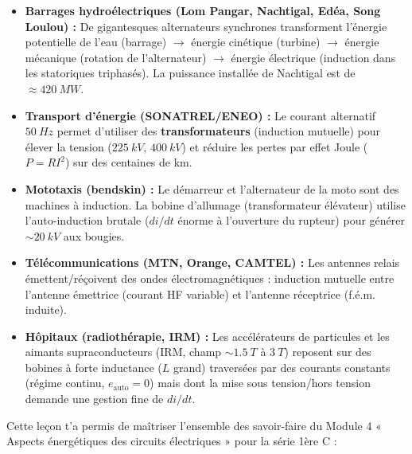\documentclass[11pt]{article}
\newcounter{popsec}
\newcounter{popsub}
\newcommand{\courssub}[1]{%
  \stepcounter{popsub}%
  \par\vspace{9pt}\noindent{\popxbold\fontsize{11.5}{13}\selectfont\color{popink}{\color{poporange}\thepopsec.\thepopsub}\hspace{6pt}#1}\par\nopagebreak\vspace{4pt}
}
\begin{document}
\begin{savaistu}
\begin{itemize}
\item \textbf{Barrages hydroélectriques (Lom Pangar, Nachtigal, Edéa, Song Loulou) :} De gigantesques alternateurs synchrones transforment l'énergie potentielle de l'eau (barrage) $\rightarrow$ énergie cinétique (turbine) $\rightarrow$ énergie mécanique (rotation de l'alternateur) $\rightarrow$ énergie électrique (induction dans les statoriques triphasés). La puissance installée de Nachtigal est de $\approx \SI{420}{MW}$.
\item \textbf{Transport d'énergie (SONATREL/ENEO) :} Le courant alternatif $\SI{50}{Hz}$ permet d'utiliser des \textbf{transformateurs} (induction mutuelle) pour élever la tension ($\SI{225}{kV}$, $\SI{400}{kV}$) et réduire les pertes par effet Joule ($P = R I^2$) sur des centaines de km.
\item \textbf{Mototaxis (bendskin) :} Le démarreur et l'alternateur de la moto sont des machines à induction. La bobine d'allumage (transformateur élévateur) utilise l'auto-induction brutale ($di/dt$ énorme à l'ouverture du rupteur) pour générer $\sim \SI{20}{kV}$ aux bougies.
\item \textbf{Télécommunications (MTN, Orange, CAMTEL) :} Les antennes relais émettent/réçoivent des ondes électromagnétiques : induction mutuelle entre l'antenne émettrice (courant HF variable) et l'antenne réceptrice (f.é.m. induite).
\item \textbf{Hôpitaux (radiothérapie, IRM) :} Les accélérateurs de particules et les aimants supraconducteurs (IRM, champ $\sim \SI{1,5}{T}$ à $\SI{3}{T}$) reposent sur des bobines à forte inductance ($L$ grand) traversées par des courants constants (régime continu, $e_{\text{auto}}=0$) mais dont la mise sous tension/hors tension demande une gestion fine de $di/dt$.
\end{itemize}
\end{savaistu}

\courssub{Bilan de la leçon}

Cette leçon t'a permis de maîtriser l'ensemble des savoir-faire du Module 4 « Aspects énergétiques des circuits électriques » pour la série 1ère C :
\end{document}
